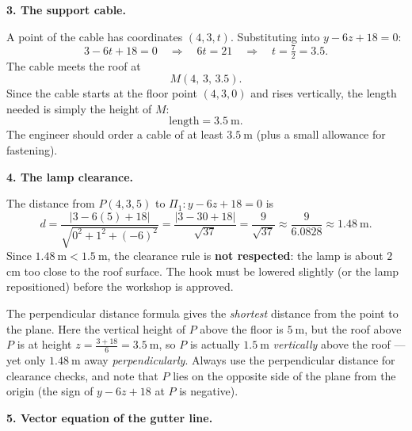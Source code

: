 \documentclass[11pt]{article}
\begin{document}
\textbf{3. The support cable.}\par

A point of the cable has coordinates $(4, 3, t)$. Substituting into $y - 6z + 18 = 0$:
\[
3 - 6t + 18 = 0 \quad\Longrightarrow\quad 6t = 21 \quad\Longrightarrow\quad t = \tfrac{7}{2} = 3.5.
\]
The cable meets the roof at
\[
M\left(4,\, 3,\, 3.5\right).
\]
Since the cable starts at the floor point $(4,3,0)$ and rises vertically, the length needed is simply the height of $M$:
\[
\text{length} = 3.5\ \mathrm{m}.
\]
The engineer should order a cable of at least $3.5\ \mathrm{m}$ (plus a small allowance for fastening).

\textbf{4. The lamp clearance.}\par

The distance from $P(4,3,5)$ to $\Pi_1 : y - 6z + 18 = 0$ is
\[
d = \frac{|3 - 6(5) + 18|}{\sqrt{0^2 + 1^2 + (-6)^2}}
= \frac{|3 - 30 + 18|}{\sqrt{37}}
= \frac{9}{\sqrt{37}}
\approx \frac{9}{6.0828} \approx 1.48\ \mathrm{m}.
\]
Since $1.48\ \mathrm{m} < 1.5\ \mathrm{m}$, the clearance rule is \textbf{not respected}: the lamp is about $2$ cm too close to the roof surface. The hook must be lowered slightly (or the lamp repositioned) before the workshop is approved.

\begin{attention}
The perpendicular distance formula gives the \emph{shortest} distance from the point to the plane. Here the vertical height of $P$ above the floor is $5\ \mathrm{m}$, but the roof above $P$ is at height $z = \tfrac{3+18}{6} = 3.5\ \mathrm{m}$, so $P$ is actually $1.5\ \mathrm{m}$ \emph{vertically} above the roof — yet only $1.48\ \mathrm{m}$ away \emph{perpendicularly}. Always use the perpendicular distance for clearance checks, and note that $P$ lies on the opposite side of the plane from the origin (the sign of $y - 6z + 18$ at $P$ is negative).
\end{attention}

\textbf{5. Vector equation of the gutter line.}\par
\end{document}
